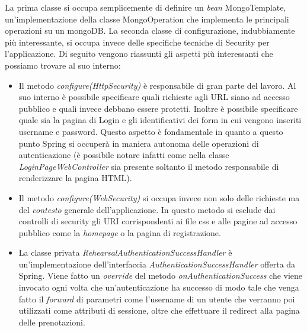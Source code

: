 La prima classe si occupa semplicemente di definire un \textsl{bean} MongoTemplate, un'implementazione della classe MongoOperation che implementa le principali operazioni su un mongoDB.\newline
La seconda classe di configurazione, indubbiamente più interessante, si occupa invece delle specifiche tecniche di Security per l'applicazione. Di seguito vengono riassunti gli aspetti più interessanti che possiamo trovare al suo interno:
\begin{itemize}
	\item Il metodo \textsl{configure(HttpSecurity)} è responsabile di gran parte del lavoro. Al suo interno è possibile specificare quali richieste agli URL siano ad accesso pubblico e quali invece debbano essere protetti. Inoltre è possibile specificare quale sia la pagina di Login e gli identificativi dei form in cui vengono inseriti username e password. Questo aspetto è fondamentale in quanto a questo punto Spring si occuperà in maniera autonoma delle operazioni di autenticazione (è possibile notare infatti come nella classe \textsl{LoginPageWebController} sia presente soltanto il metodo responsabile di renderizzare la pagina HTML).
	\item Il metodo \textsl{configure(WebSecurity)} si occupa invece non solo delle richieste ma del \textsl{contesto} generale dell'applicazione. In questo metodo si esclude dai controlli di security gli URI corrispondenti ai file css e alle pagine ad accesso pubblico come la \textsl{homepage} o la pagina di registrazione.
	\item La classe privata \textsl{RehearsalAuthenticationSuccessHandler} è un'implementazione dell'interfaccia \textsl{AuthenticationSuccessHandler} offerta da Spring. Viene fatto un \textsl{override} del metodo \textsl{onAuthenticationSuccess} che viene invocato ogni volta che un'autenticazione ha successo di modo tale che venga fatto il \textsl{forward} di parametri come l'username di un utente che verranno poi utilizzati come attributi di sessione, oltre che effettuare il redirect alla pagina delle prenotazioni.
\end{itemize}